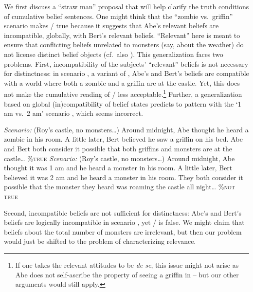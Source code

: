 \documentclass[output=paper]{langscibook}
\begin{document}
We first discuss a ``straw man'' proposal that will help clarify the truth conditions of cumulative belief sentences. One might think that the ``zombie vs.~griffin'' scenario  makes / true because it suggests that Abe's relevant beliefs are incompatible, globally, with Bert's relevant beliefs. ``Relevant'' here is meant to ensure that conflicting beliefs unrelated to monsters (say, about the weather) do not license distinct belief objects (cf.~also \citealt{Pasternak:2018a}). This generalization faces two problems. First, incompatibility of the subjects' ``relevant'' beliefs is not necessary for distinctness: in scenario , a variant of , Abe's and Bert's beliefs are  compatible with a world where both a zombie and a griffin are at the castle. Yet, this does not make the cumulative reading of / less acceptable.\footnote{If one takes the relevant attitudes to be \textit{de se}, this issue might not arise as Abe does not self-ascribe the property of seeing a griffin in  -- but our other arguments would still apply.} Further, a generalization based on global (in)compatibility of belief states predicts  to pattern with the `1 am vs.~2 am' scenario , which seems incorrect.

\eanoraggedright
\eanoraggedright \label{sch-has:ex:20} \textit{Scenario:} (Roy's castle, no monsters\ldots) Around midnight, Abe thought he heard a zombie in his room. A little later, Bert believed he saw a griffin on his bed. Abe and Bert both consider it possible that both griffins and monsters are at the castle\ldots \hfill {} \%\textsc{true} 
\ex \label{sch-has:ex:21} \textit{Scenario:} (Roy's castle, no monsters\ldots) Around midnight, Abe thought it was 1 am and he heard a monster in his room. A little later, Bert believed it was 2 am and he heard a monster in his room. They both consider it possible that the monster they heard was roaming the castle all night\ldots \hfill {} \%\textsc{not true} \z\z

\noindent Second, incompatible beliefs are not sufficient for distinctness:  Abe's and Bert's beliefs are logically incompatible  in scenario , yet / is false. We might claim that beliefs about the total number of monsters are irrelevant, but then our problem would just be shifted to the problem of characterizing relevance.
\end{document}
